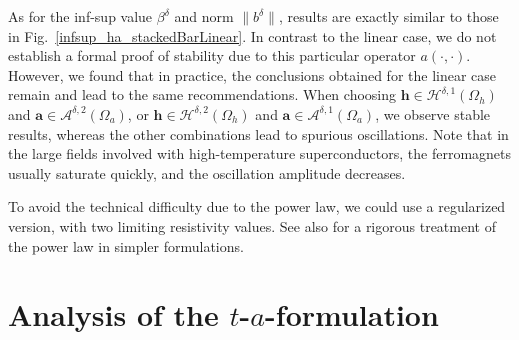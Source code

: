 \documentclass[journal]{IEEEtran}
\renewcommand{\vec}[1]{\boldsymbol{#1}} %
\newcommand{\paren}[1]{\left(#1\right)}
\renewcommand{\a}{\vec a}
\newcommand{\h}{\vec h}
\renewcommand{\j}{\vec j}
\newcommand{\ec}{e_{\text{c}}}
\newcommand{\jc}{j_{\text{c}}}
\newcommand{\Oa}{\Omega_a}
\newcommand{\Oh}{\Omega_h}
\newcommand{\taf}{$t$-$a$-formulation\ }
\newcommand{\hspdone}{\mathcal{H}^{\delta,1}}
\newcommand{\aspdone}{\mathcal{A}^{\delta,1}}
\newcommand{\hspdtwo}{\mathcal{H}^{\delta,2}}
\newcommand{\aspdtwo}{\mathcal{A}^{\delta,2}}
\begin{document}
As for the inf-sup value $\beta^\delta$ and norm $\|b^\delta\|$, results are exactly similar to those in Fig.~\ref{infsup_ha_stackedBarLinear}. In contrast to the linear case, we do not establish a formal proof of stability due to this particular operator $a(\cdot,\cdot)$. However, we found that in practice, the conclusions obtained for the linear case remain and lead to the same recommendations. When choosing $\h \in \hspdone(\Oh)$ and $\a \in \aspdtwo(\Oa)$, or $\h \in \hspdtwo(\Oh)$ and $\a \in \aspdone(\Oa)$, we observe stable results, whereas the other combinations lead to spurious oscillations. Note that in the large fields involved with high-temperature superconductors, the ferromagnets usually saturate quickly, and the oscillation amplitude decreases.

To avoid the technical difficulty due to the power law, we could use a regularized version, %
with two limiting resistivity values. %
See also \cite{van2015numerical,laforest2018p} for a rigorous treatment of the power law in simpler formulations.

\section{Analysis of the \taf}\label{sec_taf}
\end{document}
